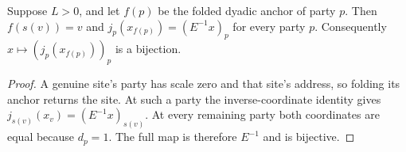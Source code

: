 \begin{theorem}
    \label{thm:peps_dyadic_folded_readout}
    \leanok
    Suppose $L>0$, and let $f(p)$ be the folded dyadic anchor of party $p$.
    Then $f(s(v))=v$ and $j_p(x_{f(p)})=(E^{-1}x)_p$ for every party $p$.
    Consequently $x\mapsto(j_p(x_{f(p)}))_p$ is a bijection.
\end{theorem}
\begin{proof}\leanok
    A genuine site's party has scale zero and that site's address, so
    folding its anchor returns the site. At such a party the inverse-coordinate
    identity gives $j_{s(v)}(x_v)=(E^{-1}x)_{s(v)}$. At every remaining party
    both coordinates are equal because $d_p=1$. The full map is therefore
    $E^{-1}$ and is bijective.
\end{proof}
